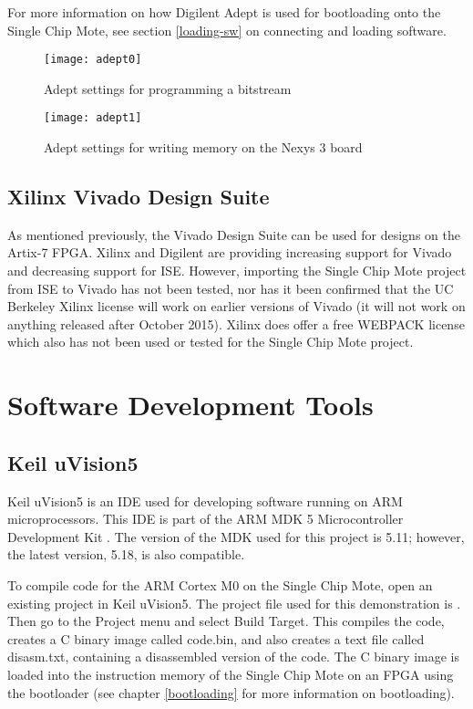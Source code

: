 For more information on how Digilent Adept is used for bootloading onto the Single Chip Mote, see section \ref{loading-sw} on connecting and loading software.

\begin{figure}
\centering
\texttt{[image: adept0]}
\caption{Adept settings for programming a bitstream}
\label{fig:adept0}
\end{figure}

\begin{figure}
\centering
\texttt{[image: adept1]}
\caption{Adept settings for writing memory on the Nexys 3 board}
\label{fig:adept1}
\end{figure}

\subsection{Xilinx Vivado Design Suite}
As mentioned previously, the Vivado Design Suite can be used for designs on the Artix-7 FPGA. Xilinx and Digilent are providing increasing support for Vivado and decreasing support for ISE. However, importing the Single Chip Mote project from ISE to Vivado has not been tested, nor has it been confirmed that the UC Berkeley Xilinx license will work on earlier versions of Vivado (it will not work on anything released after October 2015). Xilinx does offer a free WEBPACK license which also has not been used or tested for the Single Chip Mote project.

\section{Software Development Tools}

\subsection{Keil uVision5} \label{keil}
Keil uVision5 is an IDE used for developing software running on ARM microprocessors. This IDE is part of the ARM MDK 5 Microcontroller Development Kit \cite{keil-download}. The version of the MDK used for this project is 5.11; however, the latest version, 5.18, is also compatible.

To compile code for the ARM Cortex M0 on the Single Chip Mote, open an existing project in Keil uVision5. The project file used for this demonstration is . Then go to the Project menu and select Build Target. This compiles the code, creates a C binary image called code.bin, and also creates a text file called disasm.txt, containing a disassembled version of the code. The C binary image is loaded into the instruction memory of the Single Chip Mote on an FPGA using the bootloader (see chapter \ref{bootloading} for more information on bootloading).

